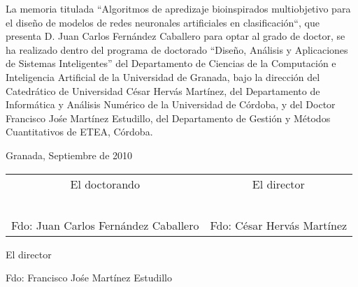\thispagestyle{empty}
\noindent La memoria titulada “Algoritmos de apredizaje bioinspirados multiobjetivo para
el	diseño de modelos de redes neuronales artificiales en clasificación``, que presenta
	D. Juan Carlos Fernández Caballero para optar al grado de doctor, se ha realizado
	dentro del programa de doctorado “Diseño, Análisis y Aplicaciones de Sistemas
	Inteligentes” del Departamento de Ciencias de la Computación e Inteligencia
	Artificial de la Universidad de Granada, bajo la dirección del Catedrático de
	Universidad César Hervás Martínez, del Departamento de Informática y Análisis Numérico de la
	Universidad de Córdoba, y del Doctor Francisco Jośe Martínez Estudillo, del Departamento de
	Gestión y Métodos Cuantitativos de ETEA, Córdoba.
	\begin{flushright}
		Granada, Septiembre de 2010
	\end{flushright}
	\vspace*{2cm}
	\begin{tabular}{cc}
		El doctorando&El director\\
		& \\
		& \\
		& \\
		& \\
		& \\
		Fdo: Juan Carlos Fernández Caballero&    Fdo: César Hervás Martínez\\
	\end{tabular}
	\vspace*{2cm}
	\begin{center}
		El director
	\end{center}
	\vspace*{2.5cm}
	\begin{center}
		Fdo: Francisco Jośe Martínez Estudillo
	\end{center}

